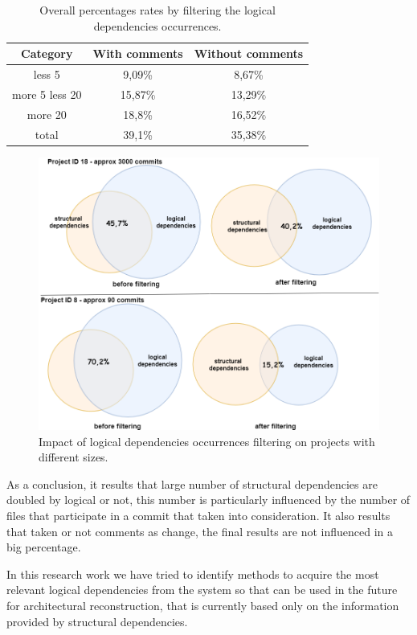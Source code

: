 \documentclass[conference]{IEEEtran}
\begin{document}
\begin{table}
  \centering
  \begin{tabular}{@{}c||cc@{}}
    \toprule
       Category & With comments & Without comments  \\
    \midrule
less 5	&	9,09\% &	8,67\%	\\
more 5 less 20	&	15,87\% &	13,29\%\\
more 20	&	18,8\%	&	16,52\%\\
total &39,1\% & 35,38\% \\
    \bottomrule
  \end{tabular}
  \caption{Overall percentages rates by filtering the logical dependencies occurrences. }
   \label{table:14}
\end{table}


\begin{figure}[htb]
\centering
\includegraphics[scale=0.5]{figvenn3.png}
\caption{Impact of logical dependencies occurrences filtering on projects with different sizes.}
\label{fig:figvenn3}
\end{figure}


As a conclusion, it results that large number of structural dependencies are doubled by logical or not, this number is particularly influenced by the number of files that participate in a commit that taken into consideration. It also results that taken or not comments as change, the final results are not influenced in a big percentage.  

In this research work we have tried to identify methods to acquire the most relevant logical dependencies from the system so that can be used in the future for architectural reconstruction, that is currently based only on the information provided by structural dependencies.
\end{document}
